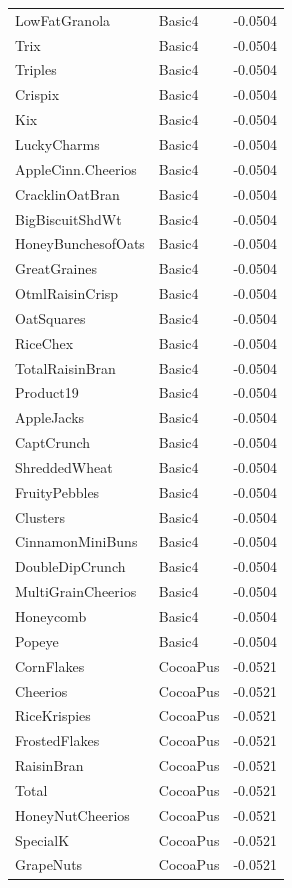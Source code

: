 \begin{longtable}{llr}
LowFatGranola & Basic4 & -0.0504 \\
Trix & Basic4 & -0.0504 \\
Triples & Basic4 & -0.0504 \\
Crispix & Basic4 & -0.0504 \\
Kix & Basic4 & -0.0504 \\
LuckyCharms & Basic4 & -0.0504 \\
AppleCinn.Cheerios & Basic4 & -0.0504 \\
CracklinOatBran & Basic4 & -0.0504 \\
BigBiscuitShdWt & Basic4 & -0.0504 \\
HoneyBunchesofOats & Basic4 & -0.0504 \\
GreatGraines & Basic4 & -0.0504 \\
OtmlRaisinCrisp & Basic4 & -0.0504 \\
OatSquares & Basic4 & -0.0504 \\
RiceChex & Basic4 & -0.0504 \\
TotalRaisinBran & Basic4 & -0.0504 \\
Product19 & Basic4 & -0.0504 \\
AppleJacks & Basic4 & -0.0504 \\
CaptCrunch & Basic4 & -0.0504 \\
ShreddedWheat & Basic4 & -0.0504 \\
FruityPebbles & Basic4 & -0.0504 \\
Clusters & Basic4 & -0.0504 \\
CinnamonMiniBuns & Basic4 & -0.0504 \\
DoubleDipCrunch & Basic4 & -0.0504 \\
MultiGrainCheerios & Basic4 & -0.0504 \\
Honeycomb & Basic4 & -0.0504 \\
Popeye & Basic4 & -0.0504 \\
CornFlakes & CocoaPus & -0.0521 \\
Cheerios & CocoaPus & -0.0521 \\
RiceKrispies & CocoaPus & -0.0521 \\
FrostedFlakes & CocoaPus & -0.0521 \\
RaisinBran & CocoaPus & -0.0521 \\
Total & CocoaPus & -0.0521 \\
HoneyNutCheerios & CocoaPus & -0.0521 \\
SpecialK & CocoaPus & -0.0521 \\
GrapeNuts & CocoaPus & -0.0521 \\

\end{longtable}
